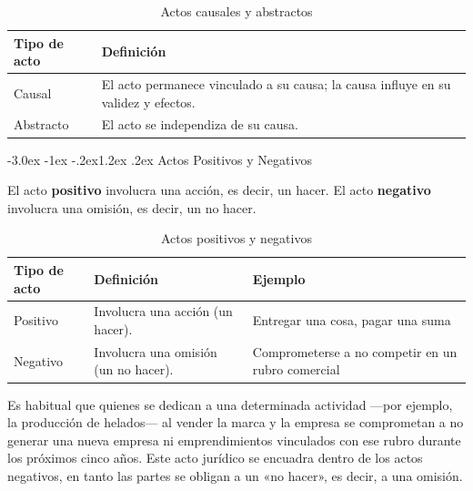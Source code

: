 \documentclass[12pt,oneside]{book}
\makeatletter
\renewcommand\section{\@startsection{section}{1}{\z@}%
  {-3.0ex \@plus -1ex \@minus -.2ex}{1.2ex \@plus .2ex}%
  {\normalfont\large\bfseries\color{acento}}}
\makeatother
\begin{document}
\begin{table}[H]
\centering
\begin{tabularx}{\textwidth}{l X}
\toprule
\textbf{Tipo de acto} & \textbf{Definición} \\
\midrule
Causal & El acto permanece vinculado a su causa; la causa influye en su validez y efectos. \\
Abstracto & El acto se independiza de su causa. \\
\bottomrule
\end{tabularx}
\caption{Actos causales y abstractos}
\end{table}


\section{Actos Positivos y Negativos}

\begin{definicion}
El acto \textbf{positivo} involucra una acción, es decir, un hacer. El acto \textbf{negativo} involucra una omisión, es decir, un no hacer.
\end{definicion}

\begin{table}[H]
\centering
\begin{tabularx}{\textwidth}{l X X}
\toprule
\textbf{Tipo de acto} & \textbf{Definición} & \textbf{Ejemplo} \\
\midrule
Positivo & Involucra una acción (un hacer). & Entregar una cosa, pagar una suma \\
Negativo & Involucra una omisión (un no hacer). & Comprometerse a no competir en un rubro comercial \\
\bottomrule
\end{tabularx}
\caption{Actos positivos y negativos}
\end{table}

\begin{ejemplo}
Es habitual que quienes se dedican a una determinada actividad ---por ejemplo, la producción de helados--- al vender la marca y la empresa se comprometan a no generar una nueva empresa ni emprendimientos vinculados con ese rubro durante los próximos cinco años. Este acto jurídico se encuadra dentro de los actos negativos, en tanto las partes se obligan a un «no hacer», es decir, a una omisión.
\end{ejemplo}
\end{document}
